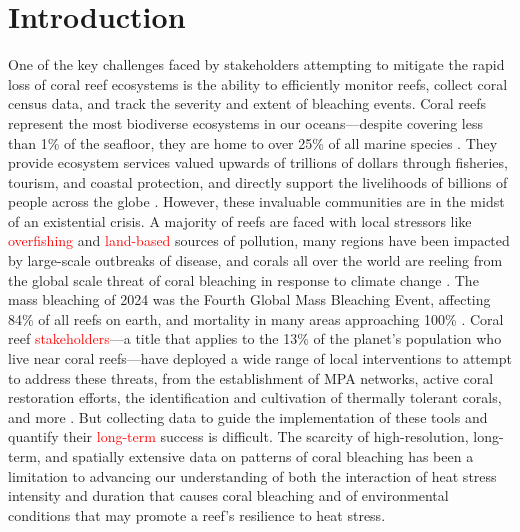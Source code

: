 \documentclass[11pt]{elsarticle}
\newcommand{\revadd}[1]{\textcolor{red}{#1}}
\newcommand{\revdel}[1]{%
  \sbox\revdelbox{#1}%
  \makebox[0pt][l]{\raisebox{0.45ex}{\rule{\wd\revdelbox}{0.4pt}}}\usebox\revdelbox
}
\begin{document}
\section{Introduction}
One of the key challenges faced by stakeholders attempting to mitigate the rapid loss of coral reef ecosystems is the ability to efficiently monitor reefs, collect coral census data, and track the severity and extent of bleaching events. Coral reefs represent the most biodiverse ecosystems in our oceans---despite covering less than 1\% of the seafloor, they are home to over 25\% of all marine species \citep{reakakudla1997}. They provide ecosystem services valued upwards of trillions of dollars through fisheries, tourism, and coastal protection, and directly support the livelihoods of billions of people across the globe \citep{costanza2014,sing2022}. However, these invaluable communities are in the midst of an existential crisis. A majority of reefs are faced with local stressors like \revdel{over fishing}\revadd{overfishing} and \revdel{land based}\revadd{land-based} sources of pollution, many regions have been impacted by large-scale outbreaks of disease, and corals all over the world are reeling from the global scale threat of coral bleaching in response to climate change \citep{burke2011reefs,vega2025, hughes2017}. The mass bleaching of 2024 was the Fourth Global Mass Bleaching Event, affecting 84\% of all reefs on earth, and mortality in many areas approaching 100\% \cite{spady2025,birkart2025}. Coral reef \revdel{stake holders}\revadd{stakeholders}---a title that applies to the 13\% of the planet's population who live near coral reefs---have deployed a wide range of local interventions to attempt to address these threats, from the establishment of MPA networks, active coral restoration efforts, the identification and cultivation of thermally tolerant corals, and more \citep{strain2019, bostrom2020}. But collecting data to guide the implementation of these tools and quantify their \revdel{long term}\revadd{long-term} success is difficult. The scarcity of high-resolution, long-term, and spatially extensive data on patterns of coral bleaching has been a limitation to advancing our understanding of both the interaction of heat stress intensity and duration that causes coral bleaching and of environmental conditions that may promote a reef's resilience to heat stress.
\end{document}
